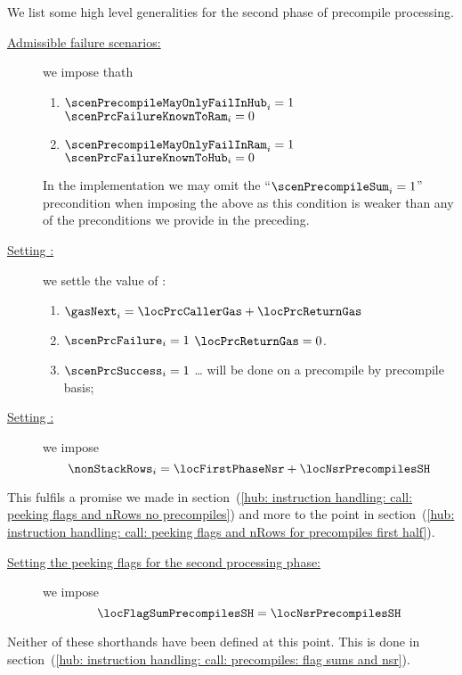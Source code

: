 \begin{center}
\end{center}
We list some high level generalities for the second phase of precompile processing. 
\begin{description}
	\item[\underline{Admissible failure scenarios:}]
		we impose thath
		\begin{enumerate}
			\item \If $\scenPrecompileMayOnlyFailInHub _{i} = 1$ \Then $\scenPrcFailureKnownToRam _{i} = 0$
			\item \If $\scenPrecompileMayOnlyFailInRam _{i} = 1$ \Then $\scenPrcFailureKnownToHub _{i} = 0$
		\end{enumerate}
		\saNote{}
		In the implementation we may omit the ``$\scenPrecompileSum _{i} = 1$'' precondition when imposing the above
		as this condition is weaker than any of the preconditions we provide in the preceding.
	\item[\underline{Setting \gasNext{}:}] we settle the value of \gasNext{}:
		\begin{enumerate}
			\item $\gasNext_{i} = \locPrcCallerGas + \locPrcReturnGas$
			\item \If $\scenPrcFailure_{i} = 1$ \Then $\locPrcReturnGas = 0$.
			\item \If $\scenPrcSuccess_{i} = 1$ \Then \dots{} will be done on a precompile by precompile basis;
		\end{enumerate}
	\item[\underline{Setting \nonStackRows{}:}]
		we impose
		\[ \nonStackRows_{i} = \locFirstPhaseNsr + \locNsrPrecompilesSH \]
\end{description}
\saNote{} This fulfils a promise we made in
section~(\ref{hub: instruction handling: call: peeking flags and nRows no precompiles}) and more to the point in
section~(\ref{hub: instruction handling: call: peeking flags and nRows for precompiles first half}).
\begin{description}
	\item[\underline{Setting the peeking flags for the second processing phase:}]
		we impose
		\[ \locFlagSumPrecompilesSH = \locNsrPrecompilesSH \]
\end{description} 
\saNote{} 
Neither of these shorthands have been defined at this point. This is done in section~(\ref{hub: instruction handling: call: precompiles: flag sums and nsr}).
